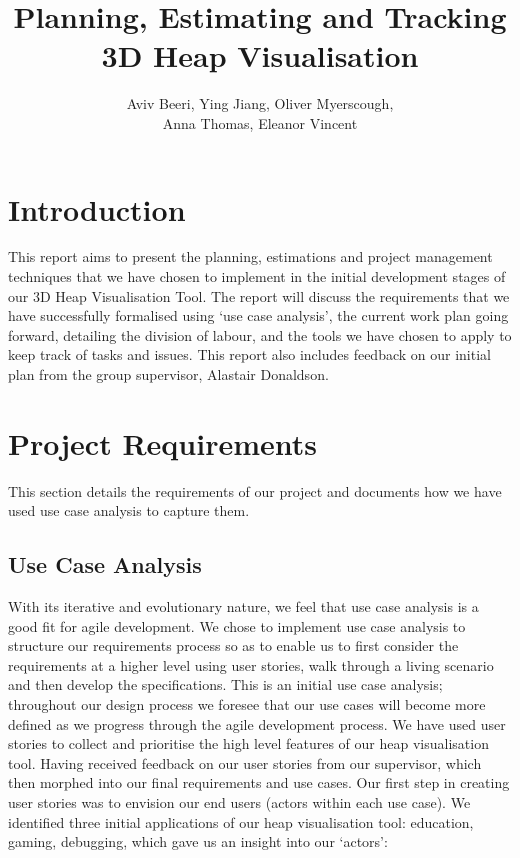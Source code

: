 \documentclass[10pt, a4paper]{article}
\begin{document}
\title{Planning, Estimating and Tracking
\\ 3D Heap Visualisation}
\author{Aviv Beeri, Ying Jiang, Oliver Myerscough, 
\\ Anna Thomas, Eleanor Vincent}
\maketitle

\section{Introduction} 
This report aims to present the planning, estimations and project management techniques that we have chosen to implement in the initial development stages of our 3D Heap Visualisation Tool. The report will discuss the requirements that we have successfully formalised using ‘use case analysis’, the current work plan going forward, detailing the division of labour, and the tools we have chosen to apply to keep track of tasks and issues. This report also includes feedback on our initial plan from the group supervisor, Alastair Donaldson. 

\section{Project Requirements}
This section details the requirements of our project and documents how we have used use case analysis to capture them.

\subsection{Use Case Analysis}

With its iterative and evolutionary nature, we feel that use case analysis is a good fit for agile development. We chose to implement use case analysis to structure our requirements process so as to enable us to first consider the requirements at a higher level using user stories, walk through a living scenario and then develop the specifications. This is an initial use case analysis; throughout our design process we foresee that our use cases will become more defined as we progress through the agile development process. We have used user stories to collect and prioritise the high level features of our heap visualisation tool. Having received feedback on our user stories from our supervisor, which then morphed into our final requirements and use cases. Our first step in creating user stories was to envision our end users (actors within each use case). We identified three initial applications of our heap visualisation tool: education, gaming, debugging, which gave us an insight into our ‘actors’:
\end{document}
